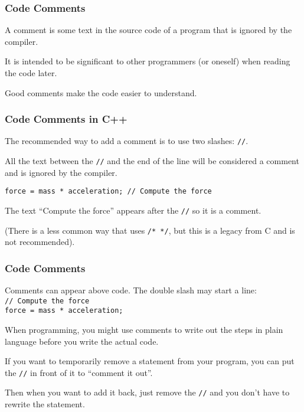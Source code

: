 %
%
%
%


\begin{frame}
\frametitle{Code Comments}
A comment is some text in the source code of a program that is ignored by the compiler.

It is intended to be significant to other programmers (or oneself) when reading the code later.

Good comments make the code easier to understand.

\end{frame}

\begin{frame}
\frametitle{Code Comments in C++}

The recommended way to add a comment is to use two slashes: \texttt{//}.

All the text between the \texttt{//} and the end of the line will be considered a comment and is ignored by the compiler.

\texttt{force = mass * acceleration; // Compute the force}

The text ``Compute the force'' appears after the \texttt{//} so it is a comment.

(There is a less common way that uses \texttt{/* */}, but this is a legacy from C and is not recommended).

\end{frame}

\begin{frame}
\frametitle{Code Comments}
Comments can appear above code. The double slash may start a line:\\
\texttt{// Compute the force}\\
\texttt{force = mass * acceleration; }

When programming, you might use comments to write out the steps in plain language before you write the actual code.

If you want to temporarily remove a statement from your program, you can put the \texttt{//} in front of it to ``comment it out''.

Then when you want to add it back, just remove the \texttt{//} and you don't have to rewrite the statement.

\end{frame}

